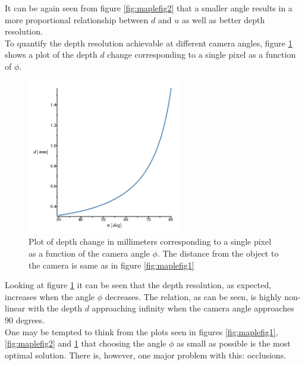 It can be again seen from figure \ref{fig:maplefig2} that a smaller angle results in a more proportional relationship between $d$ and $u$ as well as better depth resolution.\\

To quantify the depth resolution achievable at different camera angles, figure \ref{fig:maplefig3} shows a plot of the depth $d$ change corresponding to a single pixel as a function of $\phi$. 

\begin{figure}[H]
    \centering
    \includegraphics[width=0.6\textwidth]{figures/reconstruction/maplefig_res_crop.pdf}
    \caption{Plot of depth change in millimeters corresponding to a single pixel as a function of the camera angle $\phi$. The distance from the object to the camera is same as in figure \ref{fig:maplefig1}}
    \label{fig:maplefig3}
\end{figure}

Looking at figure \ref{fig:maplefig3} it can be seen that the depth resolution, as expected, increases when the angle $\phi$ decreases. The relation, as can be seen, is highly non-linear with the depth $d$ approaching infinity when the camera angle approaches 90 degrees.\\

One may be tempted to think from the plots seen in figures \ref{fig:maplefig1}, \ref{fig:maplefig2} and \ref{fig:maplefig3} that choosing the angle $\phi$ as small as possible is the most optimal solution. There is, however, one major problem with this: occlusions.\\

